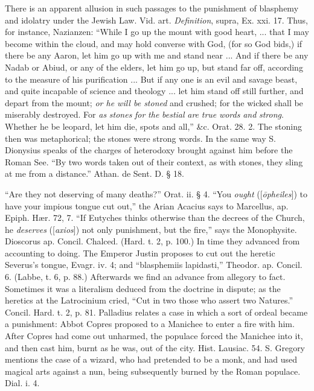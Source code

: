 There is an apparent allusion in such passages to
the punishment of blasphemy and idolatry under the Jewish Law. Vid.
art. \emph{Definition}, supra, Ex.
xxi. 17. Thus, for instance, Nazianzen: ``While I go up the mount with
good heart, ... that I may become within the cloud, and may hold
converse with God, (for so God bids,) if there be any Aaron, let him
go up with me and stand near ... And if there be any Nadab or Abiud,
or any of the elders, let him go up, but stand far off, according to
the measure of his purification ... But if any one is an evil and
savage beast, and quite incapable of science and theology ... let him
stand off still further, and depart from the mount; \emph{or
he will be stoned} and crushed; for the wicked shall be miserably
destroyed. For \emph{as} \emph{stones} \emph{for} \emph{the}
\emph{bestial} \emph{are}
\emph{true} \emph{words} \emph{and}
\emph{strong}. Whether he be
leopard, let him die, spots and all,'' \&c. Orat. 28. 2. The stoning
then was metaphorical; the stones were strong words. In the same
way S. Dionysius speaks of the charges of heterodoxy brought against
him before the Roman See. ``By two words taken out of their context, as
with stones, they sling at me from a distance.'' Athan. de Sent. D. §
18.

``Are they not deserving of many deaths?'' Orat.
ii. § 4. ``You \emph{ought} ([\emph{\={o}pheiles}])
to have your impious tongue cut out,'' the Arian Acacius says to
Marcellus, ap. Epiph. Hær. 72, 7. ``If Eutyches thinks otherwise than
the decrees of the Church, he \emph{deserves}
([\emph{axios}]) not only punishment, but the fire,'' says the
Monophysite. Dioscorus ap. Concil. Chalced. (Hard. t. 2, p. 100.) In
time they advanced from accounting to doing. The Emperor Justin
proposes to cut out the heretic Severus's tongue, Evagr. iv. 4; and ``blasphemiis
lapidasti,'' Theodor. ap. Concil. 6. (Labbe, t. 6, p. 88.) Afterwards
we find an advance from allegory to fact. Sometimes it was a
literalism deduced from the doctrine in dispute; as the heretics at
the Latrocinium cried, ``Cut in two those who assert two Natures.''
Concil. Hard. t. 2, p. 81. Palladius relates a case in which a sort of
ordeal became a punishment: Abbot Copres proposed to a Manichee to
enter a fire with him. After Copres had come out unharmed, the
populace forced the Manichee into it, and then cast him, burnt as he
was, out of the city. Hist. Lausiac. 54. S. Gregory mentions the case
of a wizard, who had pretended to be a monk, and had used magical arts
against a nun, being subsequently burned by the Roman populace. Dial.
i. 4.

